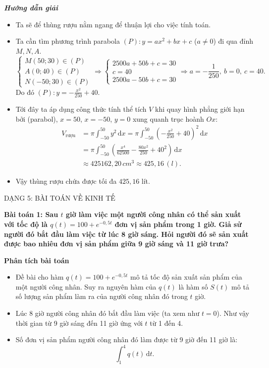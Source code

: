 \documentclass[12pt,a4paper]{article}
\newcommand{\dd}{\,\mathrm{d}}
\newcommand{\analysis}{\noindent\raisebox{0.15ex}{\rule{1.6ex}{1.6ex}}\hspace{4pt}\textbf{Phân tích bài toán}\par}
\newcommand{\solution}{\begin{center}\textbf{\textit{Hướng dẫn giải}}\end{center}\par}
\begin{document}
\solution
\begin{itemize}
\item Ta sẽ để thùng rượu nằm ngang để thuận lợi cho việc tính toán.
\item Ta cần tìm phương trình parabola $(P):y=ax^2+bx+c$ ($a\ne0$) đi qua đỉnh $M,N,A$.
\[
\begin{cases}
M(50;30)\in(P)\\
A(0;40)\in(P)\\
N(-50;30)\in(P)
\end{cases}
\Longrightarrow
\begin{cases}
2500a+50b+c=30\\c=40\\2500a-50b+c=30
\end{cases}
\Longrightarrow a=-\frac1{250},\ b=0,\ c=40.
\]
Do đó $(P):y=-\frac{x^2}{250}+40$.
\item Tới đây ta áp dụng công thức tính thể tích $V$ khi quay hình phẳng giới hạn bởi (parabol), $x=50$, $x=-50$, $y=0$ xung quanh trục hoành $Ox$:
\[
\begin{aligned}
V_{\text{rượu}}&=\pi\int_{-50}^{50}y^2\dd x
=\pi\int_{-50}^{50}\left(-\frac{x^2}{250}+40\right)^2\dd x\\
&=\pi\int_{-50}^{50}\left(\frac{x^4}{62500}-\frac{80x^2}{250}+40^2\right)\dd x\\
&\approx425162,20\,cm^3\approx425,16\,(l).
\end{aligned}
\]
\item Vậy thùng rượu chứa được tối đa $425,16$ lít.
\end{itemize}

\begin{dangbox}DẠNG 5: BÀI TOÁN VỀ KINH TẾ\end{dangbox}

\textbf{Bài toán 1: Sau $t$ giờ làm việc một người công nhân có thể sản xuất với tốc độ là $q(t)=100+e^{-0,5t}$ đơn vị sản phẩm trong 1 giờ. Giả sử người đó bắt đầu làm việc từ lúc 8 giờ sáng. Hỏi người đó sẽ sản xuất được bao nhiêu đơn vị sản phẩm giữa 9 giờ sáng và 11 giờ trưa?}\par\medskip
\begin{analysisbox}
\analysis
\begin{itemize}
\item Đề bài cho hàm $q(t)=100+e^{-0,5t}$ mô tả tốc độ sản xuất sản phẩm của một người công nhân. Suy ra nguyên hàm của $q(t)$ là hàm số $S(t)$ mô tả số lượng sản phẩm làm ra của người công nhân đó trong $t$ giờ.
\item Lúc 8 giờ người công nhân đó bắt đầu làm việc (ta xem như $t=0$). Như vậy thời gian từ 9 giờ sáng đến 11 giờ ứng với $t$ từ 1 đến 4.
\item Số đơn vị sản phẩm người công nhân đó làm được từ 9 giờ đến 11 giờ là:
\[
\int_1^4q(t)\dd t.
\]
\end{itemize}
\end{analysisbox}
\end{document}
